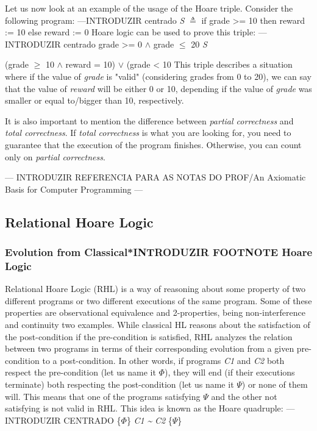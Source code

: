 Let us now look at an example of the usage of the Hoare triple. Consider the following program:
---INTRODUZIR centrado \emph{S} $\triangleq$ if grade >= 10 then reward := 10 else reward := 0 
Hoare logic can be used to prove this triple:
---INTRODUZIR centrado {grade >= 0 $\land$ grade $\leq$ 20} \emph{S} {(grade $\geq$ 10 $\land$ reward = 10) $\lor$ (grade < 10 
This triple describes a situation where if the value of \emph{grade} is "valid" (considering grades from 0 to 20), we can say that the value of \emph{reward} will be either 0 or 10, depending if the value of \emph{grade} was smaller or equal to/bigger than 10, respectively.

It is also important to mention the difference between \emph{partial correctness} and \emph{total correctness}.
If \emph{total correctness} is what you are looking for, you need to guarantee that the execution of the program finishes.
Otherwise, you can count only on \emph{partial correctness}.

--- INTRODUZIR REFERENCIA PARA AS NOTAS DO PROF/An Axiomatic Basis for Computer Programming ---


\subsection{Relational Hoare Logic} 
\label{sub:relational_hoare_logic}

\subsubsection{Evolution from Classical*INTRODUZIR FOOTNOTE Hoare Logic}
\label{sub:relational_hoare_logic_motivation}
Relational Hoare Logic (RHL) is a way of reasoning about some property of two different programs or two different executions of the same program.
Some of these properties are observational equivalence and 2-properties, being non-interference and continuity two examples.
While classical HL reasons about the satisfaction of the post-condition if the pre-condition is satisfied, RHL analyzes the relation between two programs in terms of their corresponding evolution from a given pre-condition to a post-condition.
In other words, if programs \emph{C1} and \emph{C2} both respect the pre-condition (let us name it $\Phi$), they will end (if their executions terminate) both respecting the post-condition (let us name it $\Psi$) or none of them will.
This means that one of the programs satisfying $\Psi$ and the other not satisfying is not valid in RHL.
This idea is known as the Hoare quadruple:
--- INTRODUZIR CENTRADO \{$\Phi$\} \emph{C1} \emph{\textasciitilde} \emph{C2} \{$\Psi$\}

}
